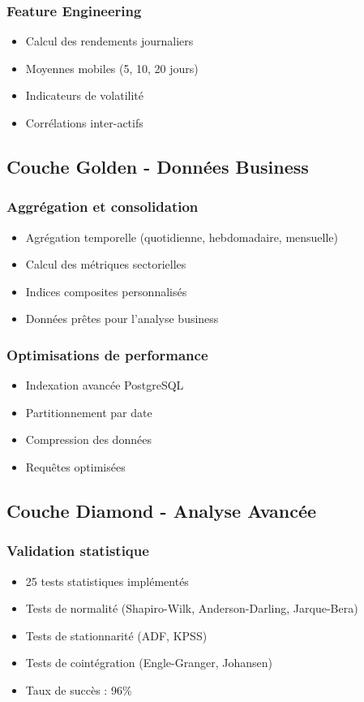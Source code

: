 \subsubsection{Feature Engineering}
\begin{itemize}
    \item Calcul des rendements journaliers
    \item Moyennes mobiles (5, 10, 20 jours)
    \item Indicateurs de volatilité
    \item Corrélations inter-actifs
\end{itemize}

\subsection{Couche Golden - Données Business}
\subsubsection{Aggrégation et consolidation}
\begin{itemize}
    \item Agrégation temporelle (quotidienne, hebdomadaire, mensuelle)
    \item Calcul des métriques sectorielles
    \item Indices composites personnalisés
    \item Données prêtes pour l'analyse business
\end{itemize}

\subsubsection{Optimisations de performance}
\begin{itemize}
    \item Indexation avancée PostgreSQL
    \item Partitionnement par date
    \item Compression des données
    \item Requêtes optimisées
\end{itemize}

\subsection{Couche Diamond - Analyse Avancée}
\subsubsection{Validation statistique}
\begin{itemize}
    \item 25 tests statistiques implémentés
    \item Tests de normalité (Shapiro-Wilk, Anderson-Darling, Jarque-Bera)
    \item Tests de stationnarité (ADF, KPSS)
    \item Tests de cointégration (Engle-Granger, Johansen)
    \item Taux de succès : 96\%
\end{itemize}

